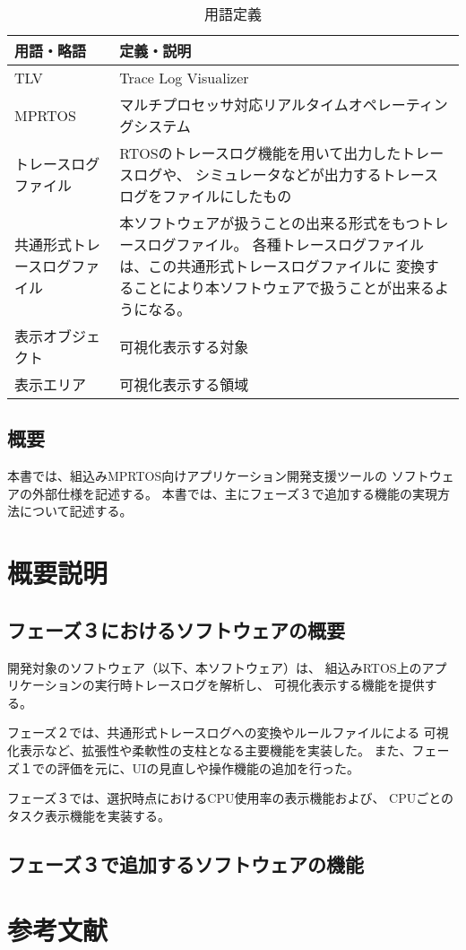 \documentclass[a4j]{jsarticle}
\begin{document}
\begin{table}[h]
 \centering
 \caption{用語定義}
 \begin{tabular}{|p{8em}|p{36em}|} \hline
  用語・略語& 定義・説明\\ \hline \hline
  TLV& Trace Log Visualizer\\ \hline
  MPRTOS& マルチプロセッサ対応リアルタイムオペレーティングシステム\\
  \hline
  トレースログファイル&
      RTOSのトレースログ機能を用いて出力したトレースログや、
      シミュレータなどが出力するトレースログをファイルにしたもの\\
  \hline
  共通形式トレースログファイル&
      本ソフトウェアが扱うことの出来る形式をもつトレースログファイル。
      各種トレースログファイルは、この共通形式トレースログファイルに
      変換することにより本ソフトウェアで扱うことが出来るようになる。 \\
  \hline
  表示オブジェクト&
      可視化表示する対象\\
  \hline
  表示エリア&
      可視化表示する領域\\
  \hline
 \end{tabular}
\end{table}

\subsection{概要}
本書では、組込みMPRTOS向けアプリケーション開発支援ツールの
ソフトウェアの外部仕様を記述する。
本書では、主にフェーズ３で追加する機能の実現方法について記述する。

\clearpage
\section{概要説明}
\subsection{フェーズ３におけるソフトウェアの概要}
開発対象のソフトウェア（以下、本ソフトウェア）は、
組込みRTOS上のアプリケーションの実行時トレースログを解析し、
可視化表示する機能を提供する。

フェーズ２では、共通形式トレースログへの変換やルールファイルによる
可視化表示など、拡張性や柔軟性の支柱となる主要機能を実装した。
また、フェーズ１での評価を元に、UIの見直しや操作機能の追加を行った。

フェーズ３では、選択時点におけるCPU使用率の表示機能および、
CPUごとのタスク表示機能を実装する。

\subsection{フェーズ３で追加するソフトウェアの機能}



\clearpage
\section*{参考文献}
\end{document}
